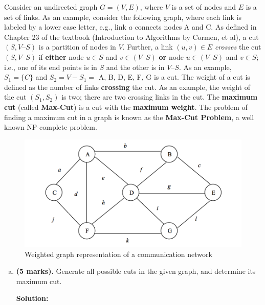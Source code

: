 \begin{homeworkProblem}
Consider an undirected graph $G = (V, E)$, where $V$ is a set of nodes and $E$ 
is a  set of links. As an example, consider the following graph, where each 
link is  labeled by a lower case letter, e.g., link $a$ connects nodes A and C. 
As defined  in Chapter 23 of the textbook (Introduction to Algorithms by Cormen, 
et al), a  cut $(S, V – S)$ is a partition of nodes in $V$. Further, a link 
$(u, v) \in E$ \textit{crosses} the cut $(S, V – S)$ if \textbf{either} node 
$u \in S$ and $v \in (V – S)$ \textbf{or} node $u \in (V – S)$ and  $v \in S$; 
i.e., one of its end points is in $S$ and the other is in  $V – S$. As an  
example, $S_1 = \{C\}$ and $S_2 = V - S_1 =$ {A, B, D, E, F, G} is a cut. 
The weight of a  cut is defined as the number of links \textbf{crossing} the cut. 
As an  example, the  weight of the cut $(S_1, S_2)$ is two; there are two 
crossing links in the cut. The \textbf{maximum cut} (called \textbf{Max-Cut}) is 
a cut with the \textbf{maximum weight}. The problem of finding a maximum cut in 
a graph is known as the \textbf{Max-Cut Problem}, a well known NP-complete 
problem. \\[2cm]

\begin{figure}[h]
\begin{center}

\includegraphics[scale=0.97]{Diag2}
\caption{Weighted graph representation of a communication network}

\end{center}
\end{figure}

\clearpage

\begin{enumerate}[a)]
	\item \textbf{(5 marks).} Generate all possible cuts in the given graph, and 
    determine its maximum cut.
    \par
	\textbf{Solution:}
    \par


\end{enumerate}
\end{homeworkProblem}
